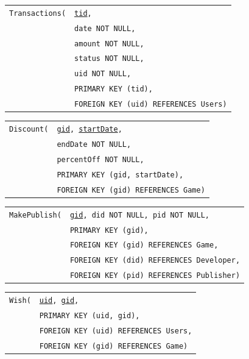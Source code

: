 \documentclass[12pt, oneside]{article}
\begin{document}
\begin{tabular}{l@{}l}
    \texttt{Transactions(} & \texttt{\underline{tid},}\\
                            & \texttt{date NOT NULL,}\\
                            & \texttt{amount NOT NULL,}\\
                            & \texttt{status NOT NULL,}\\
                            & \texttt{uid NOT NULL,}\\
                            & \texttt{PRIMARY KEY (tid),}\\
                            & \texttt{FOREIGN KEY (uid) REFERENCES Users)}
\end{tabular}

\begin{tabular}{l@{}l}
    \texttt{Discount(} & \texttt{\underline{gid}, \underline{startDate},}\\
                        & \texttt{endDate NOT NULL,}\\
                        & \texttt{percentOff NOT NULL,}\\
                        & \texttt{PRIMARY KEY (gid, startDate),}\\
                        & \texttt{FOREIGN KEY (gid) REFERENCES Game)}
\end{tabular}

\begin{tabular}{l@{}l}
    \texttt{MakePublish(} & \texttt{\underline{gid}, did NOT NULL, pid NOT NULL,}\\
                           & \texttt{PRIMARY KEY (gid),}\\
                           & \texttt{FOREIGN KEY (gid) REFERENCES Game,}\\
                           & \texttt{FOREIGN KEY (did) REFERENCES Developer,}\\
                           & \texttt{FOREIGN KEY (pid) REFERENCES Publisher)}
\end{tabular}

\begin{tabular}{l@{}l}
    \texttt{Wish(} & \texttt{\underline{uid}, \underline{gid},}\\
                    & \texttt{PRIMARY KEY (uid, gid),}\\
                    & \texttt{FOREIGN KEY (uid) REFERENCES Users,}\\
                    & \texttt{FOREIGN KEY (gid) REFERENCES Game)}
\end{tabular}
\end{document}
